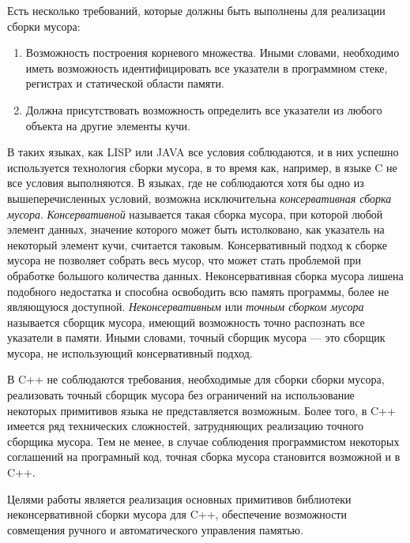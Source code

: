 Есть несколько требований, которые должны быть выполнены для реализации сборки мусора:
\begin{enumerate}
\item Возможность построения корневого множества. Иными словами, необходимо иметь возможность идентифицировать все указатели в программном стеке, регистрах
и статической области памяти.
\item Должна присутствовать возможность определить все указатели из любого объекта на другие элементы кучи.
\end{enumerate}
В таких языках, как LISP или JAVA все условия соблюдаются, и в них успешно используется технология сборки мусора, в то время как, например,
в языке C не все условия выполняются. В языках, где не соблюдаются хотя бы одно из вышеперечисленных условий, возможна исключительна
\textit{консервативная сборка мусора}.
\textit{Консервативной} называется такая сборка мусора, при которой любой элемент данных, значение которого может быть истолковано, как указатель на
некоторый элемент кучи, считается  таковым. Консервативный подход к сборке мусора не позволяет собрать весь мусор, что может стать проблемой при обработке
большого количества данных. Неконсервативная сборка мусора лишена подобного недостатка и способна освободить всю память программы, более не
являющуюся доступной. \textit{Неконсервативным} или  \textit{точным сборком мусора} называется сборщик мусора, имеющий возможность точно распознать
все указатели в памяти. Иными словами, точный сборщик мусора --- это сборщик мусора, не использующий консервативный подход.

В C++ не соблюдаются требования, необходимые для сборки сборки мусора, реализовать точный сборщик мусора без ограничений
на использование некоторых примитивов языка не представляется возможным.
Более того, в C++ имеется ряд технических сложностей, затрудняющих реализацию точного сборщика мусора.
Тем не менее, в случае соблюдения программистом некоторых соглашений на програмный код,
точная сборка мусора становится возможной и в C++.

Целями работы является реализация основных примитивов библиотеки неконсервативной сборки мусора для C++,
обеспечение возможности совмещения ручного и автоматического управления памятью.